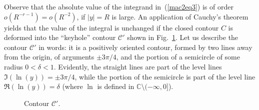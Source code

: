 \documentclass[11pt]{article}
\numberwithin{equation}{section}
\newcommand{\C}{\mathbb{C}}
\newcommand{\CC}{\mathcal{C}}
\begin{document}
Observe that the absolute value of the integrand in~(\ref{mac2eq3}) is of order $o(R^{-r-1}) = o(R^{-2})$, if $|y| = R$ is large. An application of Cauchy's theorem yields that the value of the integral is unchanged if the closed contour $C$ is deformed into the ``keyhole'' contour $\CC'$ shown in Fig.~\ref{fig:Cprime}.
Let us describe the contour $\CC'$ in words: it is a positively oriented contour, formed by two lines away from the origin, of arguments $\pm 3\pi/4$, and the portion of a semicircle of some radius $0 < \delta < 1$. Evidently, the straight lines are part of the level lines $\Im(\ln(y)) = \pm 3\pi/4$, while the portion of the semicircle is part of the level line $\Re(\ln(y)) = \delta$ (where $\ln$ is def\/ined in $\C \setminus (-\infty, 0]$).

\begin{figure}[t]\centering
{}
\caption{Contour $\CC'$.}\label{fig:Cprime}
\end{figure}
\end{document}
